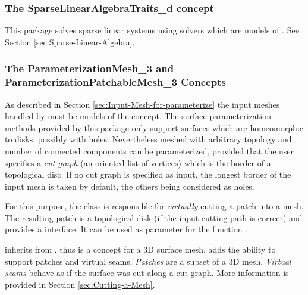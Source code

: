 \subsubsection{The SparseLinearAlgebraTraits\_d concept}

This package solves sparse linear systems using solvers which are models
of . See Section \ref{sec:Sparse-Linear-Algebra}.


\subsubsection{The ParameterizationMesh\_3 and ParameterizationPatchableMesh\_3 Concepts}

As described in Section \ref{sec:Input-Mesh-for-parameterize}
the input meshes handled by 
must be models of the  concept. The surface parameterization methods provided by this package only support
surfaces which are homeomorphic to disks, possibly with holes. Nevertheless meshed with arbitrary topology and number of connected components can be parameterized, provided that the user specifies a \emph{cut graph} (an oriented list of
vertices) which is the border of a topological disc. If no cut graph is
specified as input, the longest border of the input mesh is taken by default, the others being considered as holes.

For this purpose, the
class is responsible for \emph{virtually} cutting
a patch into a  mesh.
The resulting patch is a topological
disk (if the input cutting path is correct)
and provides a  interface. It can be used as
parameter for the function .

 inherits from ,
thus is a concept for a 3D surface mesh.
 adds the ability to support patches and
virtual seams. \emph{Patches} are a subset of a 3D mesh.
\emph{Virtual seams} behave as if the surface was cut along a cut graph. More information is provided in Section \ref{sec:Cutting-a-Mesh}.
